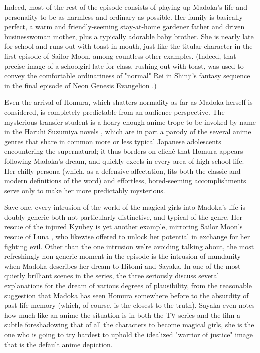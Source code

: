 Indeed, most of the rest of the episode consists of playing up Madoka's life and personality to be as harmless and ordinary as possible. Her family is basically perfect, a warm and friendly-seeming stay-at-home gardener father and driven businesswoman mother, plus a typically adorable baby brother. She is nearly late for school and runs out with toast in mouth, just like the titular character in the first episode of Sailor Moon, among countless other examples. (Indeed, that precise image of a schoolgirl late for class, rushing out with toast, was used to convey the comfortable ordinariness of "normal" Rei in Shinji's fantasy sequence in the final episode of Neon Genesis Evangelion \cite{ref18}.)

Even the arrival of Homura, which shatters normality as far as Madoka herself is considered, is completely predictable from an audience perspective. The mysterious transfer student is a hoary enough anime trope to be invoked by name in the Haruhi Suzumiya novels \cite{ref19}, which are in part a parody of the several anime genres that share in common more or less typical Japanese adolescents encountering the supernatural; it thus borders on cliché that Homura appears following Madoka's dream, and quickly excels in every area of high school life. Her chilly persona (which, as a defensive affectation, fits both the classic and modern definitions of the word) and effortless, bored-seeming accomplishments serve only to make her more predictably mysterious. 

Save one, every intrusion of the world of the magical girls into Madoka's life is doubly generic-both not particularly distinctive, and typical of the genre. Her rescue of the injured Kyubey is yet another example, mirroring Sailor Moon's rescue of Luna \cite{ref20}, who likewise offered to unlock her potential in exchange for her fighting evil. Other than the one intrusion we're avoiding talking about, the most refreshingly non-generic moment in the episode is the intrusion of mundanity when Madoka describes her dream to Hitomi and Sayaka. In one of the most quietly brilliant scenes in the series, the three seriously discuss several explanations for the dream of various degrees of plausibility, from the reasonable suggestion that Madoka has seen Homura somewhere before to the absurdity of past life memory (which, of course, is the closest to the truth). Sayaka even notes how much like an anime the situation is in both the TV series and the film-a subtle foreshadowing that of all the characters to become magical girls, she is the one who is going to try hardest to uphold the idealized "warrior of justice" image that is the default anime depiction.

